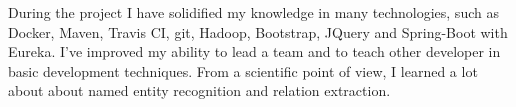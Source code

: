 During the project I have solidified my knowledge in many technologies, such as Docker, Maven, Travis CI, git, Hadoop, Bootstrap, JQuery and Spring-Boot with Eureka. I've improved my ability to lead a team and to teach other developer in basic development techniques. From a scientific point of view, I learned a lot about about named entity recognition and relation extraction.